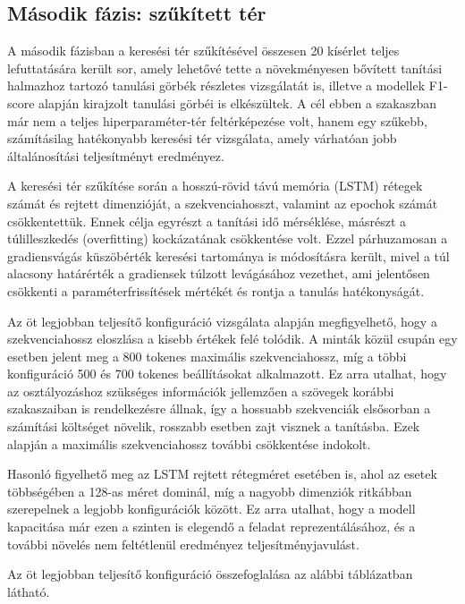 \subsection{Második fázis: szűkített tér}

A második fázisban a keresési tér szűkítésével összesen 20 kísérlet teljes lefuttatására került sor, amely lehetővé tette a növekményesen bővített tanítási halmazhoz tartozó tanulási görbék részletes vizsgálatát is, illetve a modellek F1-score alapján kirajzolt tanulási görbéi is elkészültek. A cél ebben a szakaszban már nem a teljes hiperparaméter-tér feltérképezése volt, hanem egy szűkebb, számításilag hatékonyabb keresési tér vizsgálata, amely várhatóan jobb általánosítási teljesítményt eredményez.

A keresési tér szűkítése során a hosszú-rövid távú memória (LSTM) rétegek számát és rejtett dimenzióját, a szekvenciahosszt, valamint az epochok számát csökkentettük. Ennek célja egyrészt a tanítási idő mérséklése, másrészt a túlilleszkedés (overfitting) kockázatának csökkentése volt. Ezzel párhuzamosan a gradiensvágás küszöbérték keresési tartománya is módosításra került, mivel a túl alacsony határérték a gradiensek túlzott levágásához vezethet, ami jelentősen csökkenti a paraméterfrissítések mértékét és rontja a tanulás hatékonyságát.

Az öt legjobban teljesítő konfiguráció vizsgálata alapján megfigyelhető, hogy a szekvenciahossz eloszlása a kisebb értékek felé tolódik. A minták közül csupán egy esetben jelent meg a 800 tokenes maximális szekvenciahossz, míg a többi konfiguráció 500 és 700 tokenes beállításokat alkalmazott. Ez arra utalhat, hogy az osztályozáshoz szükséges információk jellemzően a szövegek korábbi szakaszaiban is rendelkezésre állnak, így a hossuabb szekvenciák elsősorban a számítási költséget növelik, rosszabb esetben zajt visznek a tanításba. Ezek alapján a maximális szekvenciahossz további csökkentése indokolt.

Hasonló figyelhető meg az LSTM rejtett rétegméret esetében is, ahol az esetek többségében a 128-as méret dominál, míg a nagyobb dimenziók ritkábban szerepelnek a legjobb konfigurációk között. Ez arra utalhat, hogy a modell kapacitása már ezen a szinten is elegendő a feladat reprezentálásához, és a további növelés nem feltétlenül eredményez teljesítményjavulást.

Az öt legjobban teljesítő konfiguráció összefoglalása az alábbi táblázatban látható.

